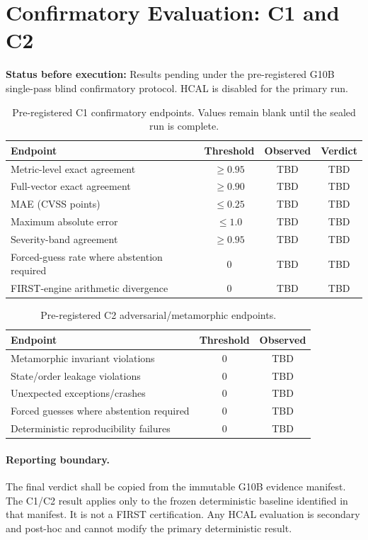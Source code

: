 
\section*{Confirmatory Evaluation: C1 and C2}
\textbf{Status before execution:} Results pending under the pre-registered
G10B single-pass blind confirmatory protocol. HCAL is disabled for the primary
run.

\begin{table}[ht]
\centering
\caption{Pre-registered C1 confirmatory endpoints. Values remain blank until the sealed run is complete.}
\begin{tabular}{lccc}
\toprule
Endpoint & Threshold & Observed & Verdict \\
\midrule
Metric-level exact agreement & $\geq 0.95$ & TBD & TBD \\
Full-vector exact agreement & $\geq 0.90$ & TBD & TBD \\
MAE (CVSS points) & $\leq 0.25$ & TBD & TBD \\
Maximum absolute error & $\leq 1.0$ & TBD & TBD \\
Severity-band agreement & $\geq 0.95$ & TBD & TBD \\
Forced-guess rate where abstention required & $0$ & TBD & TBD \\
FIRST-engine arithmetic divergence & $0$ & TBD & TBD \\
\bottomrule
\end{tabular}
\end{table}

\begin{table}[ht]
\centering
\caption{Pre-registered C2 adversarial/metamorphic endpoints.}
\begin{tabular}{lcc}
\toprule
Endpoint & Threshold & Observed \\
\midrule
Metamorphic invariant violations & $0$ & TBD \\
State/order leakage violations & $0$ & TBD \\
Unexpected exceptions/crashes & $0$ & TBD \\
Forced guesses where abstention required & $0$ & TBD \\
Deterministic reproducibility failures & $0$ & TBD \\
\bottomrule
\end{tabular}
\end{table}

\paragraph{Reporting boundary.}
The final verdict shall be copied from the immutable G10B evidence manifest.
The C1/C2 result applies only to the frozen deterministic baseline identified
in that manifest. It is not a FIRST certification. Any HCAL evaluation is
secondary and post-hoc and cannot modify the primary deterministic result.
